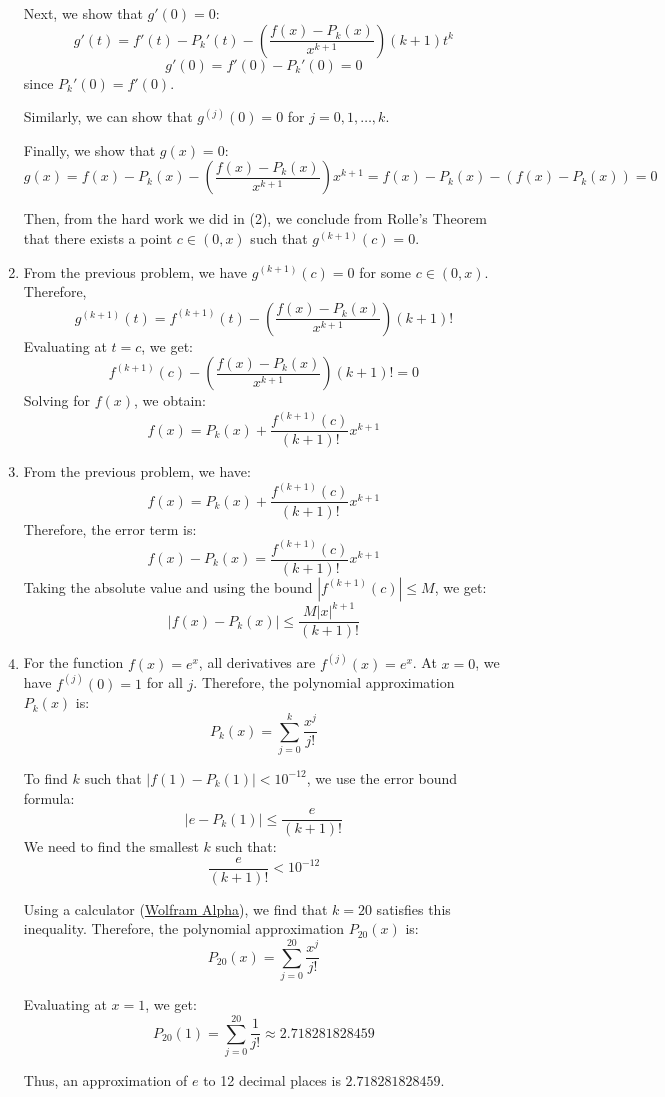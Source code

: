\documentclass[12pt]{article}
\begin{document}
\begin{enumerate}
          Next, we show that \(g'(0) = 0\):
          \[
              g'(t) = f'(t) - P_{k}'(t) - \left(\frac{f(x) - P_{k}(x)}{x^{k + 1}}\right)(k + 1)t^k
          \]
          \[
              g'(0) = f'(0) - P_{k}'(0) = 0
          \]
          since \(P_{k}'(0) = f'(0)\).

          Similarly, we can show that \(g^{(j)}(0) = 0\) for \(j = 0, 1, \ldots, k\).

          Finally, we show that \(g(x) = 0\):
          \[
              g(x) = f(x) - P_{k}(x) - \left(\frac{f(x) - P_{k}(x)}{x^{k + 1}}\right)x^{k + 1} = f(x) - P_{k}(x) - (f(x) - P_{k}(x)) = 0
          \]

          Then, from the hard work we did in (2), we conclude from Rolle's Theorem that there exists a point \(c \in (0, x)\) such that \(g^{(k + 1)}(c) = 0\).
    \item
          From the previous problem, we have \(g^{(k + 1)}(c) = 0\) for some \(c \in (0, x)\). Therefore,
          \[
              g^{(k + 1)}(t) = f^{(k + 1)}(t) - \left(\frac{f(x) - P_{k}(x)}{x^{k + 1}}\right)(k + 1)!
          \]
          Evaluating at \(t = c\), we get:
          \[
              f^{(k + 1)}(c) - \left(\frac{f(x) - P_{k}(x)}{x^{k + 1}}\right)(k + 1)! = 0
          \]
          Solving for \(f(x)\), we obtain:
          \[
              f(x) = P_{k}(x) + \frac{f^{(k + 1)}(c)}{(k + 1)!}x^{k + 1}
          \]
    \item
          From the previous problem, we have:
          \[
              f(x) = P_{k}(x) + \frac{f^{(k + 1)}(c)}{(k + 1)!}x^{k + 1}
          \]
          Therefore, the error term is:
          \[
              f(x) - P_{k}(x) = \frac{f^{(k + 1)}(c)}{(k + 1)!}x^{k + 1}
          \]
          Taking the absolute value and using the bound \(|f^{(k + 1)}(c)| \leq M\), we get:
          \[
              |f(x) - P_{k}(x)| \leq \frac{M |x|^{k + 1}}{(k + 1)!}
          \]
    \item
          For the function \(f(x) = e^x\), all derivatives are \(f^{(j)}(x) = e^x\). At \(x = 0\), we have \(f^{(j)}(0) = 1\) for all \(j\). Therefore, the polynomial approximation \(P_{k}(x)\) is:
          \[
              P_{k}(x) = \sum_{j=0}^{k} \frac{x^j}{j!}
          \]

          To find \(k\) such that \(|f(1) - P_{k}(1)| < 10^{-12}\), we use the error bound formula:
          \[
              |e - P_{k}(1)| \leq \frac{e}{(k + 1)!}
          \]
          We need to find the smallest \(k\) such that:
          \[
              \frac{e}{(k + 1)!} < 10^{-12}
          \]

          Using a calculator (\href{https://www.wolframalpha.com/input?i=solve+for+k%3A+e%2F%28k+%2B+1%29%21+%3C+10%5E-12}{Wolfram Alpha}), we find that \(k = 20\) satisfies this inequality. Therefore, the polynomial approximation \(P_{20}(x)\) is:
          \[
              P_{20}(x) = \sum_{j=0}^{20} \frac{x^j}{j!}
          \]

          Evaluating at \(x = 1\), we get:
          \[
              P_{20}(1) = \sum_{j=0}^{20} \frac{1}{j!} \approx 2.718281828459
          \]

          Thus, an approximation of \(e\) to 12 decimal places is \(2.718281828459\).
\end{enumerate}
\end{document}
